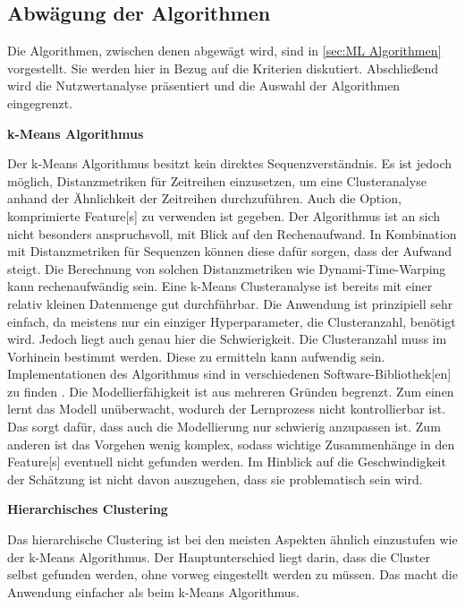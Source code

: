 \subsection{Abwägung der Algorithmen}
Die Algorithmen, zwischen denen abgewägt wird, sind in \autoref{sec:ML Algorithmen} vorgestellt. Sie werden hier in Bezug auf die Kriterien diskutiert. Abschließend wird die Nutzwertanalyse präsentiert und die Auswahl der Algorithmen eingegrenzt. \dubpar

\textbf{k-Means Algorithmus}\par
Der k-Means Algorithmus besitzt kein direktes Sequenzverständnis. Es ist jedoch möglich, Distanzmetriken für Zeitreihen einzusetzen, um eine Clusteranalyse anhand der Ähnlichkeit der Zeitreihen durchzuführen. Auch die Option, komprimierte \gls{Feature}[s] zu verwenden ist gegeben. Der Algorithmus ist an sich nicht besonders anspruchsvoll, mit Blick auf den Rechenaufwand. In Kombination mit Distanzmetriken für Sequenzen können diese dafür sorgen, dass der Aufwand steigt. Die Berechnung von solchen Distanzmetriken wie Dynami-Time-Warping kann rechenaufwändig sein. Eine k-Means Clusteranalyse ist bereits mit einer relativ kleinen Datenmenge gut durchführbar. Die Anwendung ist prinzipiell sehr einfach, da meistens nur ein einziger \gls{Hyperparameter}, die Clusteranzahl, benötigt wird. Jedoch liegt auch genau hier die Schwierigkeit. Die Clusteranzahl muss im Vorhinein bestimmt werden. Diese zu ermitteln kann aufwendig sein. Implementationen des Algorithmus sind in verschiedenen Software-\gls{Bibliothek}[en] zu finden \cite{FabianPedregosa.2011}. Die Modellierfähigkeit ist aus mehreren Gründen begrenzt. Zum einen lernt das Modell unüberwacht, wodurch der Lernprozess nicht kontrollierbar ist. Das sorgt dafür, dass auch die Modellierung nur schwierig anzupassen ist. Zum anderen ist das Vorgehen wenig komplex, sodass wichtige Zusammenhänge in den \gls{Feature}[s] eventuell nicht gefunden werden. Im Hinblick auf die Geschwindigkeit der Schätzung ist nicht davon auszugehen, dass sie problematisch sein wird.\dubpar

\clearpage
\textbf{Hierarchisches Clustering}\par
Das hierarchische Clustering ist bei den meisten Aspekten ähnlich einzustufen wie der k-Means Algorithmus. Der Hauptunterschied liegt darin, dass die Cluster selbst gefunden werden, ohne vorweg eingestellt werden zu müssen. Das macht die Anwendung einfacher als beim k-Means Algorithmus.\dubpar

